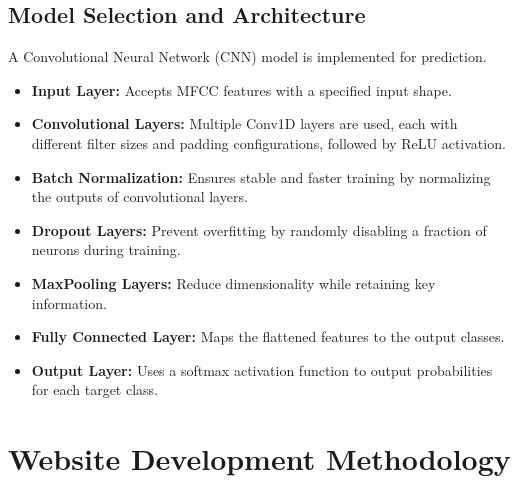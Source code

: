 \subsection{Model Selection and Architecture}
A Convolutional Neural Network (CNN) model is implemented for prediction.
\begin{itemize}
    \item \textbf{Input Layer:} Accepts MFCC features with a specified input shape.
    \item \textbf{Convolutional Layers:} Multiple Conv1D layers are used, each with different filter sizes and padding configurations, followed by ReLU activation.
    \item \textbf{Batch Normalization:} Ensures stable and faster training by normalizing the outputs of convolutional layers.
    \item \textbf{Dropout Layers:} Prevent overfitting by randomly disabling a fraction of neurons during training.
    \item \textbf{MaxPooling Layers:} Reduce dimensionality while retaining key information.
    \item \textbf{Fully Connected Layer:} Maps the flattened features to the output classes.
    \item \textbf{Output Layer:} Uses a softmax activation function to output probabilities for each target class.
\end{itemize}

\section{Website Development Methodology}

